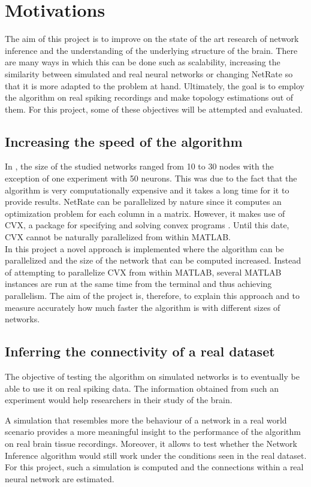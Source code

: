 \section{Motivations}

The aim of this project is to improve on the state of the art research of network inference and the understanding of the underlying structure of the brain. There are many ways in which this can be done such as scalability, increasing the similarity between simulated and real neural networks or changing NetRate so that it is more adapted to the problem at hand. Ultimately, the goal is to employ the algorithm on real spiking recordings and make topology estimations out of them. For this project, some of these objectives will be attempted and evaluated.

\subsection{Increasing the speed of the algorithm}

In \cite{alexandru2018estimating}, the size of the studied networks ranged from 10 to 30 nodes with the exception of one experiment with 50 neurons. This was due to the fact that the algorithm is very computationally expensive and it takes a long time for it to provide results. NetRate can be parallelized by nature since it computes an optimization problem for each column in a matrix. However, it makes use of CVX, a package for specifying and solving convex programs \cite{cvx,gb08}. Until this date, CVX cannot be naturally parallelized from within MATLAB. \\

In this project a novel approach is implemented where the algorithm can be parallelized and the size of the network that can be computed increased. Instead of attempting to parallelize CVX from within MATLAB, several MATLAB instances are run at the same time from the terminal and thus achieving parallelism. The aim of the project is, therefore, to explain this approach and to measure accurately how much faster the algorithm is with different sizes of networks. 

\subsection{Inferring the connectivity of a real dataset}

The objective of testing the algorithm on simulated networks is to eventually be able to use it on real spiking data. The information obtained from such an experiment would help researchers in their study of the brain. 

A simulation that resembles more the behaviour of a network in a real world scenario provides a more meaningful insight to the performance of the algorithm on real brain tissue recordings. Moreover, it allows to test whether the Network Inference algorithm would still work under the conditions seen in the real dataset. For this project, such a simulation is computed and the connections within a real neural network are estimated.

